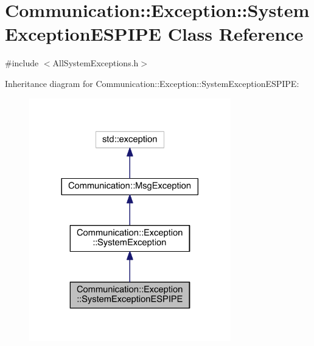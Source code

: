 \hypertarget{class_communication_1_1_exception_1_1_system_exception_e_s_p_i_p_e}{}\section{Communication\+:\+:Exception\+:\+:System\+Exception\+E\+S\+P\+I\+P\+E Class Reference}
\label{class_communication_1_1_exception_1_1_system_exception_e_s_p_i_p_e}


{\ttfamily \#include $<$All\+System\+Exceptions.\+h$>$}



Inheritance diagram for Communication\+:\+:Exception\+:\+:System\+Exception\+E\+S\+P\+I\+P\+E\+:\nopagebreak
\begin{figure}[H]
\begin{center}
\leavevmode
\includegraphics[width=248pt]{class_communication_1_1_exception_1_1_system_exception_e_s_p_i_p_e__inherit__graph}
\end{center}
\end{figure}



